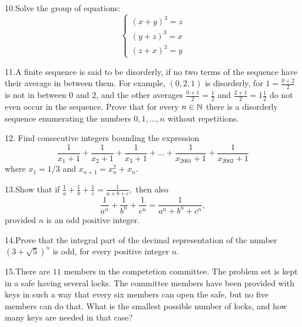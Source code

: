 \documentclass{article}
\begin{document}
10.Solve the group of equations: \[\begin{cases} (x + y)^3 = z \\ (y + z)^3 = x \\ (z + x)^3 = y \end{cases}\]

11.A finite sequence is said to be disorderly, if no two terms of the sequence have their average in between them. For example, $(0, 2, 1)$ is disorderly, for $1 = \frac{0+2}{2}$ is not in between $0$ and $2$, and the other averages $\frac{0+1}{2} = \frac{1}{2}$ and $\frac{2+1}{2} = 1\frac{1}{2}$ do not even occur in the sequence.
Prove that for every $n \in \Bbb{N}$ there is a disorderly sequence enumerating the numbers $0, 1,\ldots , n$ without repetitions.

12.	Find consecutive integers bounding the expression \[\frac{1}{x_1 + 1}+\frac{1}{x_2 + 1}+\frac{1}{x_3 + 1}+... +\frac{1}{x_{2001} + 1}+\frac{1}{x_{2002} + 1}\]
where $x_1 = 1/3$ and $x_{n+1} = x_n^2 + x_n.$

13.Show that if $\frac{1}{a}+\frac{1}{b}+\frac{1}{c}=\frac{1}{a + b + c},$ then also \[\frac{1}{a^n} +\frac{1}{b^n} +\frac{1}{c^n} =\frac{1}{a^n + b^n + c^n},\]
provided $n$ is an odd positive integer.

14.Prove that the integral part of the decimal representation of the number $(3+\sqrt{5})^n$ is odd, for every positive integer $n.$	

15.There are $11$ members in the competetion committee. The problem set is kept in a safe having several locks.
The committee members have been provided with keys in such a way that every six members can open the safe, but no five members can do that.
What is the smallest possible number of locks, and how many keys are needed in that case?
\end{document}
